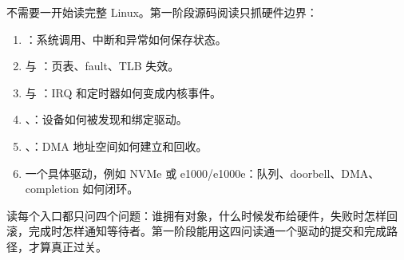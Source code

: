 不需要一开始读完整 Linux。第一阶段源码阅读只抓硬件边界：

\begin{enumerate}
\tightlist
\item {}：系统调用、中断和异常如何保存状态。
\item {} 与 ：页表、fault、TLB 失效。
\item {} 与 ：IRQ 和定时器如何变成内核事件。
\item {}、：设备如何被发现和绑定驱动。
\item {}、：DMA 地址空间如何建立和回收。
\item 一个具体驱动，例如 NVMe 或 e1000/e1000e：队列、doorbell、DMA、completion 如何闭环。
\end{enumerate}

读每个入口都只问四个问题：谁拥有对象，什么时候发布给硬件，失败时怎样回滚，完成时怎样通知等待者。第一阶段能用这四问读通一个驱动的提交和完成路径，才算真正过关。
